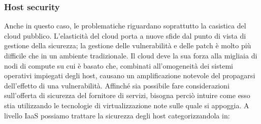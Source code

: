 \subsubsection{Host security}
Anche in questo caso, le problematiche riguardano soprattutto la casistica del cloud pubblico.
L'elasticità del cloud porta a nuove sfide dal punto di vista di gestione della sicurezza; la gestione delle vulnerabilità e delle patch è molto più difficile che in un ambiente tradizionale.
Il cloud deve la sua forza alla migliaia di nodi di compute su cui è basato che, combinati all'omogeneità dei sistemi operativi impiegati degli host, causano un amplificazione notevole del propagarsi dell'effetto di una vulnerabilità.
Affinché sia possibile fare considerazioni sull'offerta di sicurezza del fornitore di servizi, bisogna perciò intuire come esso stia utilizzando le tecnologie di virtualizzazione note sulle quale si appoggia.\cite{CloudSecurityBook}
A livello IaaS possiamo trattare la sicurezza degli host categorizzandola in:
